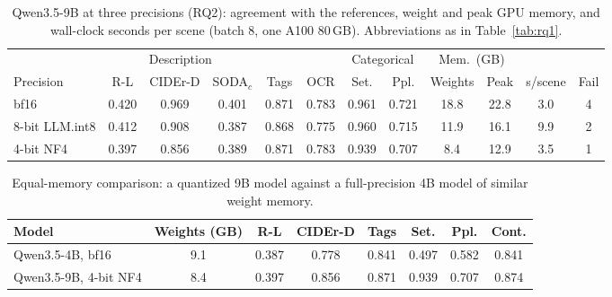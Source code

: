 \begin{table}[t]
\centering
\caption{Qwen3.5-9B at three precisions (RQ2): agreement with the references, weight and peak GPU memory, and wall-clock seconds per scene (batch 8, one A100 80\,GB). Abbreviations as in Table~\ref{tab:rq1}.}
\label{tab:rq2}
\scriptsize
\setlength{\tabcolsep}{2.6pt}
\begin{tabular}{@{}l ccc c c cc ccc c@{}}
\toprule
& \multicolumn{3}{c}{Description} & & & \multicolumn{2}{c}{Categorical} & \multicolumn{2}{c}{Mem.\ (GB)} & & \\
\cmidrule(lr){2-4}\cmidrule(lr){7-8}\cmidrule(lr){9-10}
Precision & R-L & CIDEr-D & SODA$_c$ & Tags & OCR & Set. & Ppl. & Weights & Peak & s/scene & Fail \\
\midrule
bf16 & 0.420 & 0.969 & 0.401 & 0.871 & 0.783 & 0.961 & 0.721 & 18.8 & 22.8 & 3.0 & 4 \\
8-bit LLM.int8 & 0.412 & 0.908 & 0.387 & 0.868 & 0.775 & 0.960 & 0.715 & 11.9 & 16.1 & 9.9 & 2 \\
4-bit NF4 & 0.397 & 0.856 & 0.389 & 0.871 & 0.783 & 0.939 & 0.707 & 8.4 & 12.9 & 3.5 & 1 \\
\bottomrule
\end{tabular}
\end{table}

\begin{table}[t]
\centering
\caption{Equal-memory comparison: a quantized 9B model against a full-precision 4B model of similar weight memory.}
\label{tab:equalmem}
\scriptsize
\setlength{\tabcolsep}{4pt}
\begin{tabular}{@{}l c cc ccc c@{}}
\toprule
Model & Weights (GB) & R-L & CIDEr-D & Tags & Set. & Ppl. & Cont. \\
\midrule
Qwen3.5-4B, bf16 & 9.1 & 0.387 & 0.778 & 0.841 & 0.497 & 0.582 & 0.841 \\
Qwen3.5-9B, 4-bit NF4 & 8.4 & 0.397 & 0.856 & 0.871 & 0.939 & 0.707 & 0.874 \\
\bottomrule
\end{tabular}
\end{table}
